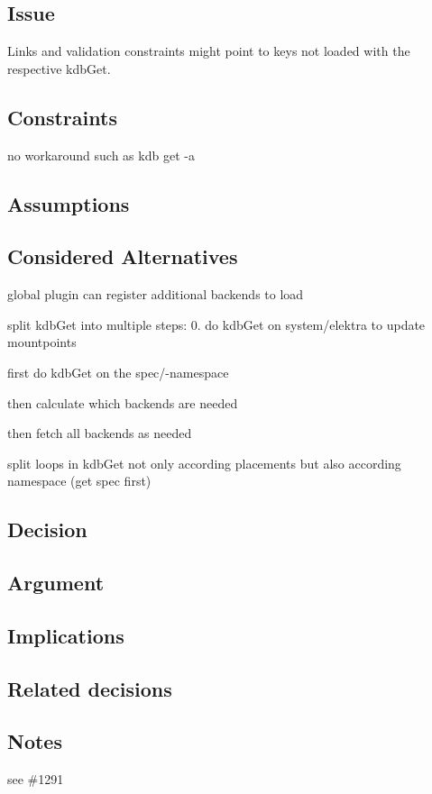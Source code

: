 \subsection*{Issue}

Links and validation constraints might point to keys not loaded with the respective {\ttfamily kdb\+Get}.

\subsection*{Constraints}


\begin{DoxyItemize}
\item no workaround such as {\ttfamily kdb get -\/a}
\end{DoxyItemize}

\subsection*{Assumptions}

\subsection*{Considered Alternatives}


\begin{DoxyItemize}
\item global plugin can register additional backends to load
\item split {\ttfamily kdb\+Get} into multiple steps\+: 0. do {\ttfamily kdb\+Get} on {\ttfamily system/elektra} to update mountpoints
\begin{DoxyEnumerate}
\item first do {\ttfamily kdb\+Get} on the {\ttfamily spec/}-\/namespace
\item then calculate which backends are needed
\item then fetch all backends as needed
\end{DoxyEnumerate}
\item split loops in {\ttfamily kdb\+Get} not only according placements but also according namespace (get spec first)
\end{DoxyItemize}

\subsection*{Decision}

\subsection*{Argument}

\subsection*{Implications}

\subsection*{Related decisions}

\subsection*{Notes}

see \#1291 